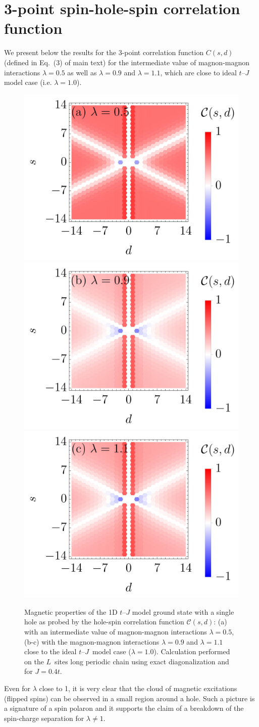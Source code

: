 \documentclass[%
 reprint,
 amsmath,amssymb,
 aps, onecolumn,
prl,
]{revtex4-1}
\begin{document}
{\color{red}
\section{3-point spin-hole-spin correlation function}
We present below the results for the 3-point correlation function $C(s,d)$ (defined in Eq.~(3) of main text) for the intermediate value of magnon-magnon interactions $\lambda = 0.5$ as well as $\lambda = 0.9$ and $\lambda = 1.1$, which are close to ideal $t$--$J$ model case (i.e. $\lambda = 1.0$).
\begin{figure}[h!]
    \includegraphics[width=0.32\columnwidth]{fig_5a.jpg}
	\includegraphics[width=0.32\columnwidth]{fig_5b.jpg}
	\includegraphics[width=0.32\columnwidth]{fig_5c.jpg}
  \caption{\color{red}Magnetic properties of the 1D $t$--$J$ model ground state with a single hole as probed by the hole-spin correlation function $\mathcal{C}(s, d)$: (a) with an intermediate value of magnon-magnon interactions $\lambda = 0.5$, (b-c) with the magnon-magnon interactions $\lambda = 0.9$ and $\lambda = 1.1$ close to the ideal $t$--$J$~model case ($\lambda = 1.0$). Calculation performed on the $L$~sites long periodic chain using exact diagonalization and for $J=0.4t$.
}
\label{fig:correlator_appendix}
\end{figure}
Even for $\lambda$ close to 1, it is very clear that the cloud of magnetic excitations (flipped spins) can be observed in a small region around a hole. Such a picture is a signature of a spin polaron and it supports the claim of a breakdown of the spin-charge separation for $\lambda \neq 1$.
}



\end{document}
